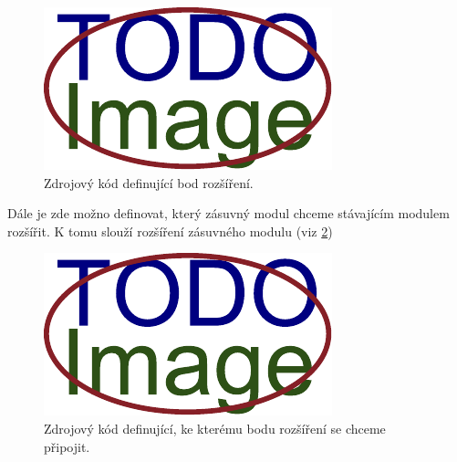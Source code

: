       
      \begin{figure}[!h]
	\includegraphics[width=\textwidth, center]{obrazky-figures/placeholder.pdf}
	\caption{Zdrojový kód definující bod rozšíření.}
	\label{fig:plugins_extension_point}
      \end{figure}
      
      Dále je zde možno definovat, který zásuvný modul chceme stávajícím modulem rozšířit. K tomu slouží rozšíření zásuvného modulu (viz \ref{fig:plugins_extend_point})
      
      \begin{figure}[!h]
	\includegraphics[width=\textwidth, center]{obrazky-figures/placeholder.pdf}
	\caption{Zdrojový kód definující, ke kterému bodu rozšíření se chceme připojit.}
	\label{fig:plugins_extend_point}
      \end{figure}

